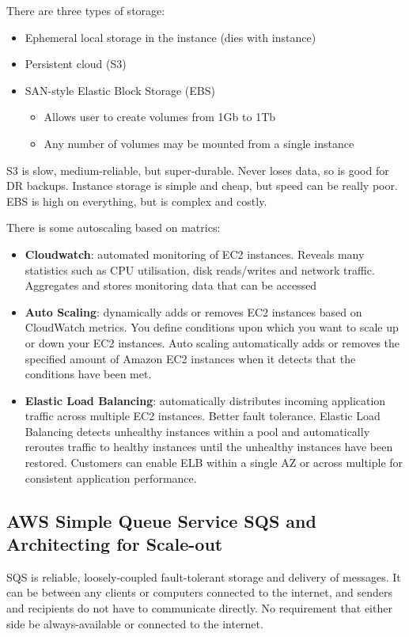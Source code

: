 \documentclass[11pt,a4paper,titlepage,dvipsnames,cmyk]{scrartcl}
\begin{document}
There are three types of storage:
\begin{itemize}
    \item Ephemeral local storage in the instance (dies with instance)
    \item Persistent cloud (S3)
    \item SAN-style Elastic Block Storage (EBS)
    \begin{itemize}
        \item Allows user to create volumes from 1Gb to 1Tb
        \item Any number of volumes may be mounted from a single instance
    \end{itemize}
\end{itemize}

S3 is slow, medium-reliable, but super-durable. Never loses data, so is good for DR backups. Instance storage is simple and cheap, but speed can be really poor. EBS is high on everything, but is complex and costly.

There is some autoscaling based on matrics:
\begin{itemize}
   \item \textbf{Cloudwatch}: automated monitoring of EC2 instances. Reveals many statistics such as CPU utilisation, disk reads/writes and network traffic. Aggregates and stores monitoring data that can be accessed
   \item \textbf{Auto Scaling}: dynamically adds or removes EC2 instances based on CloudWatch metrics. You define conditions upon which you want to scale up or down your EC2 instances. Auto scaling automatically adds or removes the specified amount of Amazon EC2 instances when it detects that the conditions have been met.
   \item \textbf{Elastic Load Balancing}: automatically distributes incoming application traffic across multiple EC2 instances. Better fault tolerance. Elastic Load Balancing detects unhealthy instances within a pool and automatically reroutes traffic to healthy instances until the unhealthy instances have been restored. Customers can enable ELB within a single AZ or across multiple for consistent application performance.
\end{itemize}

\subsection{AWS Simple Queue Service SQS and Architecting for Scale-out}
SQS is reliable, loosely-coupled fault-tolerant storage and delivery of messages. It can be between any clients or computers connected to the internet, and senders and recipients do not have to communicate directly. No requirement that either side be always-available or connected to the internet.
\end{document}
